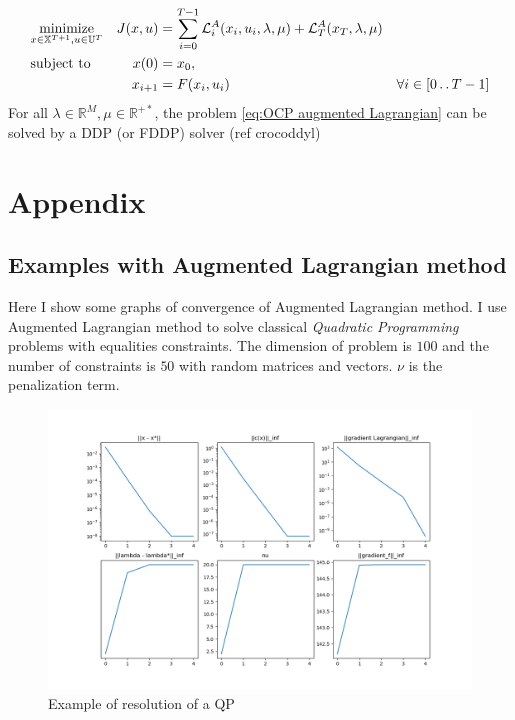 \documentclass{report}
\newcommand{\twodots}{\mathinner {\ldotp \ldotp}}
\begin{document}
\begin{equation}
\label{eq:OCP augmented Lagrangian}
\begin{aligned}
&\underset{x \in \mathbb{X}^{T+1}, u \in \mathbb{U}^T}{\text{minimize}}          &J(x, u) &=\sum_{i = 0}^{T-1} \mathcal{L}^A_i(x_i, u_i, \lambda, \mu) + \mathcal{L}^A_T(x_T, \lambda, \mu) & \\
&\text{subject to}       &x(0)      &= x_0,  & \\ %
&				  &x_{i+1}  &= F(x_i, u_i)  &\forall i \in [0 \twodots T-1] 
\end{aligned}
\end{equation}
For all $\lambda \in \mathbb{R}^M, \mu \in \mathbb{R}^{+*}$, the problem  \ref{eq:OCP augmented Lagrangian} can be solved by a DDP (or FDDP) solver (ref crocoddyl)
\chapter*{Appendix}
\section*{Examples with Augmented Lagrangian method}
Here I show some graphs of convergence of Augmented Lagrangian method. I use Augmented Lagrangian method to solve classical \emph{Quadratic Programming} problems with equalities constraints. The dimension of problem is $100$ and the number of constraints is $50$ with random matrices and vectors. $\nu$ is the penalization term.

\begin{figure}[h]
\centering
\includegraphics[scale=0.5]{classical3}
\caption{Example of resolution of a QP}
\end{figure}
\end{document}
